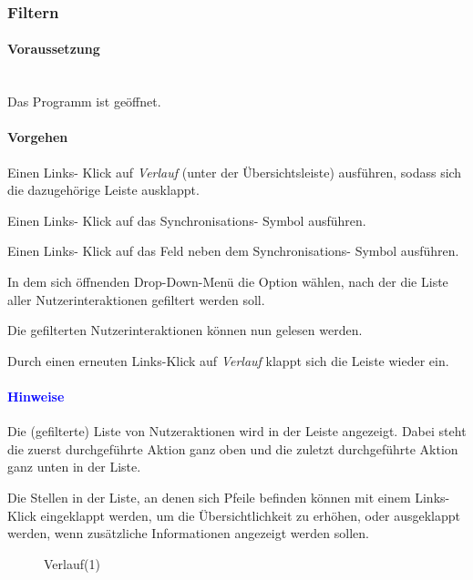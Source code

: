 \documentclass[enabledeprecatedfontcommands,fontsize=11pt,paper=a4,twoside]{scrartcl}
\newcounter{one}
\newcounter{two}[one]
\newcommand*{\hint}{\paragraph{\textcolor{blue}{Hinweise}}}
\newcommand*{\condition}{\paragraph{Voraussetzung}$\;$ \vspace{0.2cm}\\}
\newcommand*{\action}{\paragraph{Vorgehen}}
\let\tempone\itemize
\let\temptwo\enditemize
\renewenvironment{itemize}{\tempone\addtolength{\itemsep}{-10.0pt}}{\temptwo}
\let\origenumerate\enumerate
\let\origendenumerate\endenumerate
\renewenvironment{enumerate}{\origenumerate \addtolength{\itemsep}{-10.0pt}}{\origendenumerate}
\begin{document}
\subsubsection{Filtern}
	\condition 
	Das Programm ist geöffnet.
	\action
	\begin{enumerate}
		\item Einen Links- Klick auf \textit{Verlauf} (unter der Übersichtsleiste) ausführen, sodass sich die dazugehörige Leiste ausklappt.
		\item Einen Links- Klick auf das Synchronisations- Symbol ausführen.
		\item Einen Links- Klick auf das Feld neben dem Synchronisations- Symbol ausführen.
		\item In dem sich öffnenden Drop-Down-Menü die Option wählen, nach der die Liste aller Nutzerinteraktionen gefiltert werden soll.
		\item Die gefilterten Nutzerinteraktionen können nun gelesen werden. 
		\item Durch einen erneuten Links-Klick auf \textit{Verlauf} klappt sich die Leiste wieder ein.
	\end{enumerate} 
	\hint 
	\begin{itemize}
		\item Die (gefilterte) Liste von Nutzeraktionen wird in der Leiste angezeigt. Dabei steht die zuerst durchgeführte Aktion ganz oben und die zuletzt durchgeführte Aktion ganz unten in der Liste.
		\item Die Stellen in der Liste, an denen sich Pfeile befinden können mit einem Links-Klick eingeklappt werden, um die Übersichtlichkeit zu erhöhen, oder ausgeklappt werden, wenn zusätzliche Informationen angezeigt werden sollen.
	\end{itemize}

	\begin{figure}[ht!]
		\centering
		\caption{Verlauf(1)}
	
	\end{figure}
\end{document}
